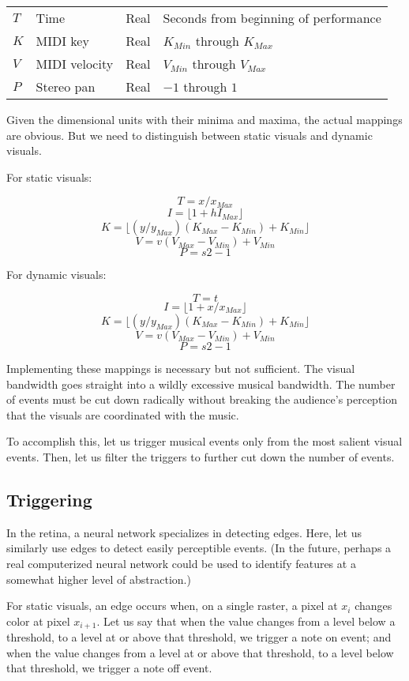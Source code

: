 \documentclass[english,11pt,letterpaper,onecolumn]{scrartcl}
\newcommand\floor[1]{\lfloor#1\rfloor}
\begin{document}
\begin{center}
\begin{tabular}{llll}
$T$ & Time & Real & Seconds from beginning of performance\\
$K$ & MIDI key & Real & $K_{Min}$ through $K_{Max}$\\
$V$ & MIDI velocity & Real & $V_{Min}$ through $V_{Max}$\\
$P$ & Stereo pan & Real & $-1$ through $1$\\
\end{tabular}
\end{center}

Given the dimensional units with their minima and maxima, the actual mappings 
are obvious. But we need to distinguish between static visuals and dynamic 
visuals.

For static visuals:

$$T = x / x_{Max} $$
$$I = \floor{1 + h I_{Max} }$$
$$K = \floor{(y / y_{Max}) (K_{Max} - K_{Min}) + K_{Min}} $$
$$V = v (V_{Max} - V_{Min}) + V_{Min}$$
$$P = s 2 - 1 $$

For dynamic visuals:

$$T = t $$
$$I = \floor{1 + x / x_{Max} }$$
$$K = \floor{(y / y_{Max}) (K_{Max} - K_{Min}) + K_{Min}} $$
$$V = v (V_{Max} - V_{Min}) + V_{Min}$$
$$P = s 2 - 1 $$

Implementing these mappings is necessary but not sufficient. The visual 
bandwidth goes straight into a wildly excessive musical bandwidth. The number 
of events must be cut down radically without breaking the audience's 
perception that the visuals are coordinated with the music. 

To accomplish this, let us trigger musical events only from the most salient 
visual events. Then, let us filter the triggers to further cut down the number 
of events.

\subsection{Triggering}

In the retina, a neural network specializes in detecting edges. Here, let us 
similarly use edges to detect easily perceptible events. (In the future, 
perhaps a real computerized neural network could be used to identify features 
at a somewhat higher level of abstraction.)

For static visuals, an edge occurs when, on a single raster, a pixel at 
$x_{i}$ changes color at pixel $x_{i + 1}$. Let us say that when the value 
changes from a level below a threshold, to a level at or above that threshold, 
we trigger a note on event; and when the value changes from a level at or 
above that threshold, to a level below that threshold, we trigger a note off 
event.
\end{document}

